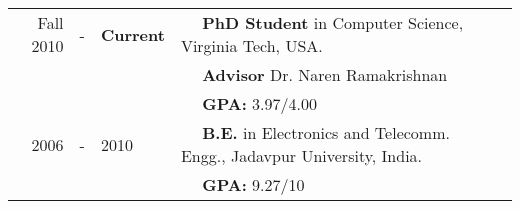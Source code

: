 
  \tabcolsep=0.11cm
  \begin{tabular}{rclll}
    Fall 2010 & - &{\bf Current} & $\quad$ {\bf PhD Student} in Computer Science, Virginia Tech, USA. \\
                & & & $\quad$ \textbf{Advisor} Dr. Naren Ramakrishnan \\
                & & & $\quad$ \textbf{GPA:} 3.97/4.00\\
    2006 & - & 2010 & $\quad$ {\bf B.E.} in Electronics and Telecomm. Engg., Jadavpur University, India. \\
        & & & $\quad$ \textbf{GPA:} 9.27/10\\
  \end{tabular}

